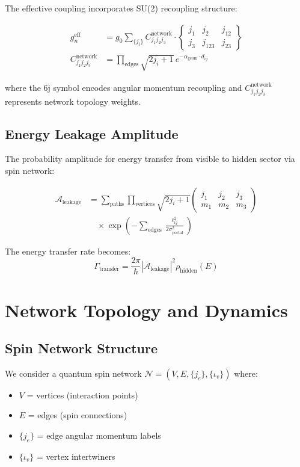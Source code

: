 \documentclass{article}
\begin{document}
The effective coupling incorporates SU(2) recoupling structure:

\begin{align}
g_n^{\text{eff}} &= g_0 \sum_{\{j_i\}} C_{j_1j_2j_3}^{\text{network}} \cdot 
\begin{Bmatrix} j_1 & j_2 & j_{12} \\ j_3 & j_{123} & j_{23} \end{Bmatrix} \\
C_{j_1j_2j_3}^{\text{network}} &= \prod_{\text{edges}} \sqrt{2j_i + 1} \, e^{-\alpha_{\text{geom}} \cdot d_{ij}}
\end{align}

where the 6j symbol encodes angular momentum recoupling and $C_{j_1j_2j_3}^{\text{network}}$ represents network topology weights.

\subsection{Energy Leakage Amplitude}

The probability amplitude for energy transfer from visible to hidden sector via spin network:

\begin{align}
\mathcal{A}_{\text{leakage}} &= \sum_{\text{paths}} \prod_{\text{vertices}} \sqrt{2j_i + 1} \begin{pmatrix} j_1 & j_2 & j_3 \\ m_1 & m_2 & m_3 \end{pmatrix} \\
&\quad \times \exp\left(-\sum_{\text{edges}} \frac{\ell_{ij}^2}{2\sigma_{\text{portal}}^2}\right)
\end{align}

The energy transfer rate becomes:
\begin{equation}
\Gamma_{\text{transfer}} = \frac{2\pi}{\hbar} |\mathcal{A}_{\text{leakage}}|^2 \rho_{\text{hidden}}(E)
\end{equation}

\section{Network Topology and Dynamics}

\subsection{Spin Network Structure}

We consider a quantum spin network $\mathcal{N} = (V, E, \{j_e\}, \{\iota_v\})$ where:
\begin{itemize}
\item $V$ = vertices (interaction points)
\item $E$ = edges (spin connections) 
\item $\{j_e\}$ = edge angular momentum labels
\item $\{\iota_v\}$ = vertex intertwiners
\end{itemize}
\end{document}

